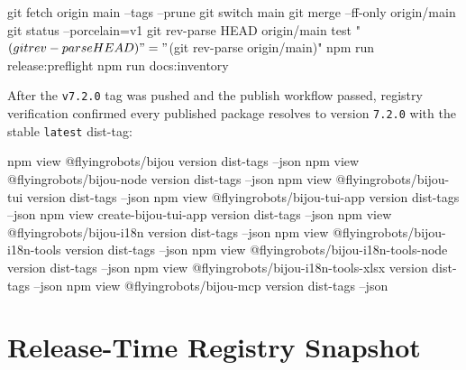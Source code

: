 \begin{CodeBlock}
git fetch origin main --tags --prune
git switch main
git merge --ff-only origin/main
git status --porcelain=v1
git rev-parse HEAD origin/main
test "$(git rev-parse HEAD)" = "$(git rev-parse origin/main)"
npm run release:preflight
npm run docs:inventory
\end{CodeBlock}

After the \texttt{v\allowbreak{}7\allowbreak{}.\allowbreak{}2\allowbreak{}.\allowbreak{}0} tag was pushed and the publish workflow passed, registry verification confirmed every published package resolves to version \texttt{7\allowbreak{}.\allowbreak{}2\allowbreak{}.\allowbreak{}0} with the stable \texttt{l\allowbreak{}a\allowbreak{}t\allowbreak{}e\allowbreak{}s\allowbreak{}t} dist-tag:

\begin{CodeBlock}
npm view @flyingrobots/bijou version dist-tags --json
npm view @flyingrobots/bijou-node version dist-tags --json
npm view @flyingrobots/bijou-tui version dist-tags --json
npm view @flyingrobots/bijou-tui-app version dist-tags --json
npm view create-bijou-tui-app version dist-tags --json
npm view @flyingrobots/bijou-i18n version dist-tags --json
npm view @flyingrobots/bijou-i18n-tools version dist-tags --json
npm view @flyingrobots/bijou-i18n-tools-node version dist-tags --json
npm view @flyingrobots/bijou-i18n-tools-xlsx version dist-tags --json
npm view @flyingrobots/bijou-mcp version dist-tags --json
\end{CodeBlock}

\section{Release-Time Registry Snapshot}\label{record-261-release-time-registry-snapshot}

